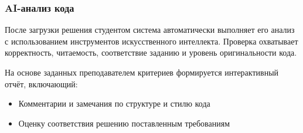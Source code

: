 \subsubsection{AI-анализ кода}
После загрузки решения студентом система автоматически выполняет его анализ с использованием инструментов искусственного интеллекта. Проверка охватывает корректность, читаемость, соответствие заданию и уровень оригинальности кода.

На основе заданных преподавателем критериев формируется интерактивный отчёт, включающий:
\begin{itemize}
    \item Комментарии и замечания по структуре и стилю кода
    \item Оценку соответствия решению поставленным требованиям
\end{itemize}
